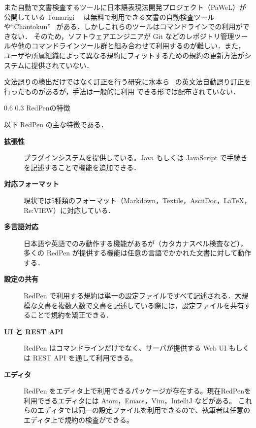 \documentclass[a4j,twocolumn]{jarticle}
\makeatletter
\def\section{\@startsection{section}{1}{\z@}%
   {0.6\Cvs}%
   {0.3\Cvs}%
   {\reset@font\fontsize{10.5pt}{0pt}\bfseries}}
\makeatother
\begin{document}
また自動で文書検査するツールに日本語表現法開発プロジェクト（PaWeL）が公開している Tomarigi~\cite{tomarigi}~\cite{tomarigi-paper}
は無料で利用できる文書の自動検査ツールや``Chantokun''~\cite{chantokun} がある．しかしこれらのツールはコマンドラインでの利用ができない．
そのため，ソフトウェアエンジニアが Git などのレポジトリ管理ツールや他のコマンドラインツール群と組み合わせて利用するのが難しい．また，
ユーザや所属組織によって異なる規約にフィットするための規約の更新方法がシステムに提供されていない． 

文法誤りの検出だけではなく訂正を行う研究に水本ら~\cite{mizumoto12english} の英文法自動誤り訂正を行ったものがあるが，手法は一般的に利用
できる形では配布されていない．

\section{RedPenの特徴}

以下 RedPen の主な特徴である．

\begin{description}

\item[{\bf 拡張性}] 
   プラグインシステムを提供している。Java もしくは JavaScript で手続きを記述することで機能を追加できる．

\item[{\bf 対応フォーマット}]
  現状では5種類のフォーマット（Markdown，Textile，AsciiDoc，LaTeX，Re:VIEW）に対応している．

\item[{\bf 多言語対応}]
  日本語や英語でのみ動作する機能があるが（カタカナスペル検査など），多くの RedPen が提供する機能は任意の言語でかかれた文書に対して動作する．

\item[{\bf 設定の共有}]
  RedPen で利用する規約は単一の設定ファイルですべて記述される．大規模な文書を複数人数で文書を記述している際には，設定ファイルを共有することで規約を矯正できる．

\item[{\bf UI と REST API}]
  RedPen はコマンドラインだけでなく、サーバが提供する Web UI もしくは REST API を通して利用できる。

\item[{\bf エディタ}]
  RedPen をエディタ上で利用できるパッケージが存在する。現在RedPenを利用できるエディタには Atom，Emacs，Vim，IntelliJ などがある。
  これらのエディタでは同一の設定ファイルを利用できるので、執筆者は任意のエディタ上で規約の検査ができる。

\end{description}
\end{document}
